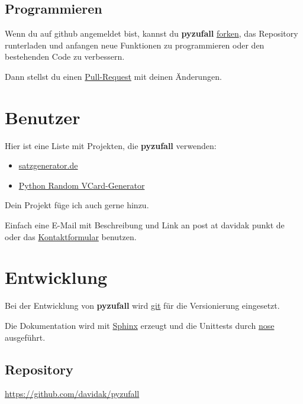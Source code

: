 \documentclass[a4paper,12pt,oneside]{sphinxmanual}
\begin{document}
\section{Programmieren}
\label{beitragen:programmieren}
Wenn du auf github angemeldet bist, kannst du \textbf{pyzufall} \href{https://help.github.com/articles/fork-a-repo}{forken}, das Repository runterladen und anfangen neue Funktionen zu programmieren oder den bestehenden Code zu verbessern.

Dann stellst du einen \href{https://help.github.com/articles/creating-a-pull-request}{Pull-Request} mit deinen Änderungen.


\chapter{Benutzer}
\label{benutzer::doc}\label{benutzer:benutzer}
Hier ist eine Liste mit Projekten, die \textbf{pyzufall} verwenden:
\begin{itemize}
\item {} 
\href{http://satzgenerator.de/}{satzgenerator.de}

\item {} 
\href{https://github.com/davidak/python-random-vcard-generator}{Python Random VCard-Generator}

\end{itemize}

Dein Projekt füge ich auch gerne hinzu.

Einfach eine E-Mail mit Beschreibung und Link an post at davidak punkt de oder das \href{http://davidak.de/kontakt}{Kontaktformular} benutzen.


\chapter{Entwicklung}
\label{entwicklung::doc}\label{entwicklung:entwicklung}
Bei der Entwicklung von \textbf{pyzufall} wird \href{http://git-scm.com/}{git} für die Versionierung eingesetzt.

Die Dokumentation wird mit \href{http://sphinx-doc.org/}{Sphinx} erzeugt und die Unittests durch \href{http://nose.readthedocs.org/}{nose} ausgeführt.


\section{Repository}
\label{entwicklung:repository}
\href{https://github.com/davidak/pyzufall}{https://github.com/davidak/pyzufall}
\end{document}
